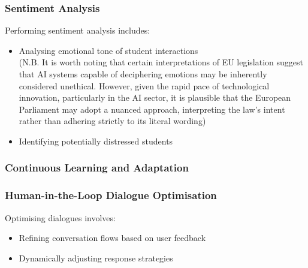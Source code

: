 \documentclass[14pt,a4paper]{article}
\begin{document}
\begin{multicols}{2}

\subsubsection*{Sentiment Analysis}
Performing sentiment analysis \textit{\parencite[pp. 50-100]{Liu2023}} includes:
\begin{itemize}
    \item Analysing emotional tone of student interactions\\ (N.B. It is worth noting that certain interpretations of EU legislation suggest that AI systems capable of deciphering emotions may be inherently considered unethical. However, given the rapid pace of technological innovation, particularly in the AI sector, it is plausible that the European Parliament may adopt a nuanced approach, interpreting the law's intent rather than adhering strictly to its literal wording) \textit{\parencite[pp. 150-175]{Dignum2023}}
    \item Identifying potentially distressed students
\end{itemize}

\subsubsection{Continuous Learning and Adaptation}

\subsubsection*{Human-in-the-Loop Dialogue Optimisation}
Optimising dialogues \textit{\parencite[pp. 50-100]{Gao2023}} involves:
\begin{itemize}
    \item Refining conversation flows based on user feedback
    \item Dynamically adjusting response strategies
\end{itemize}


\end{multicols}
\end{document}

